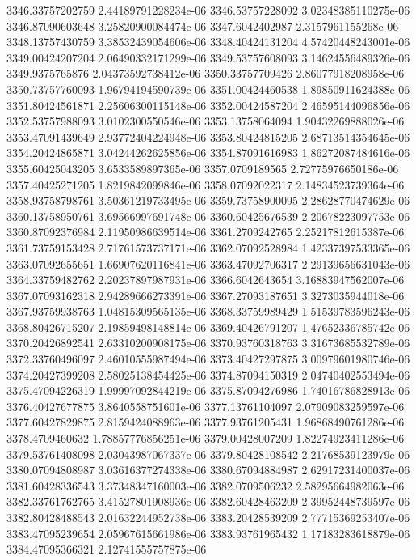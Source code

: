 {3346.33757202759 2.44189791228234e-06
3346.53757228092 3.02348385110275e-06
3346.87090603648 3.25820900084474e-06
3347.6042402987 2.3157961155268e-06
3348.13757430759 3.38532439054606e-06
3348.40424131204 4.57420448243001e-06
3349.00424207204 2.06490332171299e-06
3349.53757608093 3.14624556489326e-06
3349.9375765876 2.04373592738412e-06
3350.33757709426 2.86077918208958e-06
3350.73757760093 1.96794194590739e-06
3351.00424460538 1.89850911624388e-06
3351.80424561871 2.25606300115148e-06
3352.00424587204 2.46595144096856e-06
3352.53757988093 3.0102300550546e-06
3353.13758064094 1.90432269888026e-06
3353.47091439649 2.93772404224948e-06
3353.80424815205 2.68713514354645e-06
3354.20424865871 3.04244262625856e-06
3354.87091616983 1.86272087484616e-06
3355.60425043205 3.6533589897365e-06
3357.0709189565 2.72775976650186e-06
3357.40425271205 1.8219842099846e-06
3358.07092022317 2.14834523739364e-06
3358.93758798761 3.50361219733495e-06
3359.73758900095 2.28628770474629e-06
3360.13758950761 3.69566997691748e-06
3360.60425676539 2.20678223097753e-06
3360.87092376984 2.11950986639514e-06
3361.2709242765 2.25217812615387e-06
3361.73759153428 2.71761573737171e-06
3362.07092528984 1.42337397533365e-06
3363.07092655651 1.66907620116841e-06
3363.47092706317 2.29139656631043e-06
3364.33759482762 2.20237897987931e-06
3366.6042643654 3.16883947562007e-06
3367.07093162318 2.94289666273391e-06
3367.27093187651 3.3273035944018e-06
3367.93759938763 1.04815309565135e-06
3368.33759989429 1.51539783596243e-06
3368.80426715207 2.19859498148814e-06
3369.40426791207 1.47652336785742e-06
3370.20426892541 2.63310200908175e-06
3370.93760318763 3.31673685532789e-06
3372.33760496097 2.46010555987494e-06
3373.40427297875 3.00979601980746e-06
3374.20427399208 2.58025138454425e-06
3374.87094150319 2.04740402553494e-06
3375.47094226319 1.99997092844219e-06
3375.87094276986 1.74016786828913e-06
3376.40427677875 3.8640558751601e-06
3377.13761104097 2.07909083259597e-06
3377.60427829875 2.8159424088963e-06
3377.93761205431 1.96868490761286e-06
3378.4709460632 1.78857776856251e-06
3379.00428007209 1.82274923411286e-06
3379.53761408098 2.03043987067337e-06
3379.80428108542 2.21768539123979e-06
3380.07094808987 3.03616377274338e-06
3380.67094884987 2.62917231400037e-06
3381.60428336543 3.37348347160003e-06
3382.0709506232 2.58295664982063e-06
3382.33761762765 3.41527801908936e-06
3382.60428463209 2.39952448739597e-06
3382.80428488543 2.01632244952738e-06
3383.20428539209 2.77715369253407e-06
3383.47095239654 2.05967615661986e-06
3383.93761965432 1.17183283618879e-06
3384.47095366321 2.12741555757875e-06
}
